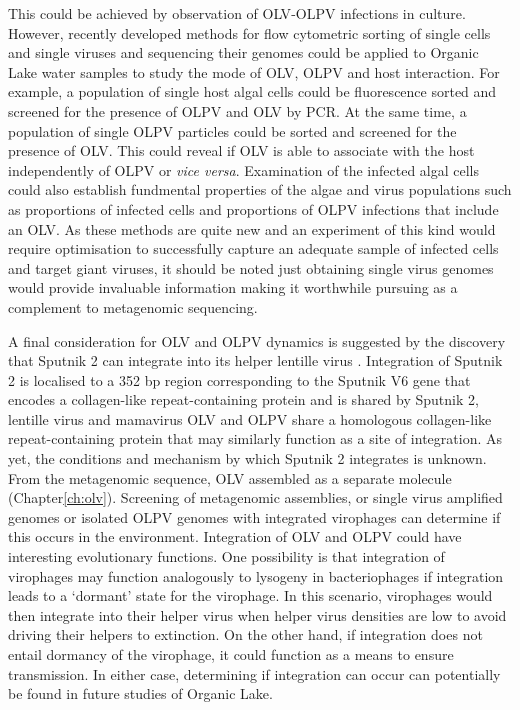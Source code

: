 This could be achieved by observation of \ac{OLV}-\ac{OLPV} infections in culture.
However, recently developed methods for flow cytometric sorting of single cells and single viruses and sequencing their genomes \cite{Martinez-Martinez2011, Allen2011} could be applied to Organic Lake water samples to study the mode of \ac{OLV}, \ac{OLPV} and host interaction.
For example, a population of single host algal cells could be fluorescence sorted and screened for the presence of \ac{OLPV} and \ac{OLV} by \acs{PCR}.
At the same time, a population of single \ac{OLPV} particles could be sorted and screened for the presence of \ac{OLV}.
This could reveal if \ac{OLV} is able to associate with the host independently of \ac{OLPV} or \emph{vice versa}.
Examination of the infected algal cells could also establish fundmental properties of the algae and virus populations such as proportions of infected cells and proportions of \ac{OLPV} infections that include an \ac{OLV}.
As these methods are quite new and an experiment of this kind would require optimisation to successfully capture an adequate sample of infected cells and target giant viruses, it should be noted just obtaining single virus genomes would provide invaluable information making it worthwhile pursuing as a complement to metagenomic sequencing.

A final consideration for \ac{OLV} and \ac{OLPV} dynamics is suggested by the discovery that Sputnik 2 can integrate into its helper lentille virus \cite{Desnues2012}.
Integration of Sputnik 2 is localised to a 352 bp region corresponding to the Sputnik V6 gene that encodes a collagen-like repeat-containing protein and is shared by Sputnik 2, lentille virus and mamavirus  \cite{Desnues2012} 
\ac{OLV} and \ac{OLPV} share a homologous collagen-like repeat-containing protein that may similarly function as a site of integration.
As yet, the conditions and mechanism by which Sputnik 2 integrates is unknown.
From the metagenomic sequence, \ac{OLV} assembled as a separate molecule (Chapter\ref{ch:olv}).
Screening of metagenomic assemblies, or single virus amplified genomes or isolated \ac{OLPV} genomes with integrated virophages can determine if this occurs in the environment.
Integration of \ac{OLV} and \ac{OLPV} could have interesting evolutionary functions.
One possibility is that integration of virophages may function analogously to lysogeny in bacteriophages if integration leads to a `dormant' state for the virophage.
In this scenario, virophages would then integrate into their helper virus when helper virus densities are low to avoid driving their helpers to extinction.
On the other hand, if integration does not entail dormancy of the virophage, it could function as a means to ensure transmission.
In either case, determining if integration can occur can potentially be found in future studies of Organic Lake.

